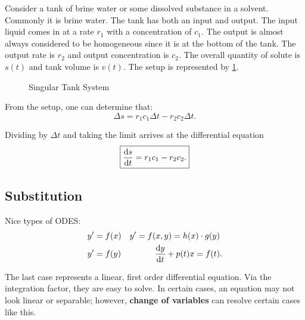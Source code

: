 \documentclass[../notes.tex]{subfiles}
\begin{document}
Consider a tank of brine water or some dissolved substance in a solvent. Commonly it is brine water. The tank has both an input and output. The input liquid comes in at a rate $r_1$ with a concentration of $c_1$. The output is almost always considered to be homogeneous since it is at the bottom of the tank. The output rate is $r_2$ and output concentration is $c_2$. The overall quantity of solute is $s(t)$ and tank volume is  $v(t)$. The setup is represented by \ref{fig:singletank}.

\begin{figure}[htpb]
    \centering
				\caption{Singular Tank System}
				\label{fig:singletank}
\end{figure}

From the setup, one can determine that:
\[
\Delta s = r_1 c_1 \Delta t - r_2 c_2 \Delta t
.\]

{ Dividing by $\Delta t$ and taking the limit arrives at the differential equation
\[
				\boxed{\dv{s}{t} = r_1 c_1 - r_2 c_2
.}\] }

\subsection{Substitution}

Nice types of ODES:
\begin{align*}
				& y'=f(x) & y'=f(x,y)=h( x ) \cdot g( y ) &\\
				& y'=f(y) & \dv{y}{t} + p( t ) x = f( t ) &
.\end{align*}

The last case represents a linear, first order differential equation. Via the integration factor, they are easy to solve. In certain cases, an equation may not look linear or separable; however, \textbf{change of variables} can resolve certain cases like this.
\end{document}
